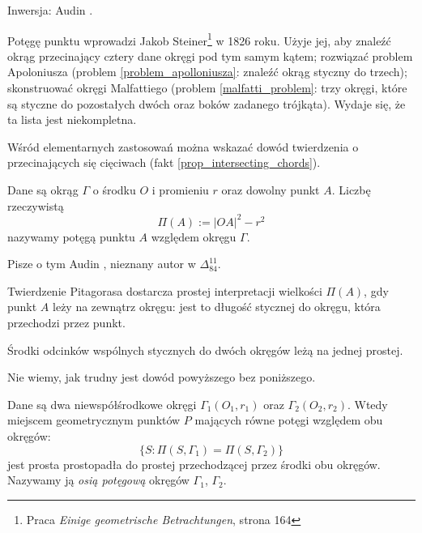 
Inwersja: Audin \cite[s. 84]{audin_2003}.


Potęgę punktu wprowadzi Jakob Steiner\footnote{Praca \emph{Einige geometrische Betrachtungen}, strona 164} w 1826 roku.
%
Użyje jej, aby znaleźć okrąg przecinający cztery dane okręgi pod tym samym kątem; rozwiązać problem Apoloniusza (problem \ref{problem_apolloniusza}: znaleźć okrąg styczny do trzech); skonstruować okręgi Malfattiego (problem \ref{malfatti_problem}: trzy okręgi, które są styczne do pozostałych dwóch oraz boków zadanego trójkąta).
%
%
Wydaje się, że ta lista jest niekompletna.

Wśród elementarnych zastosowań można wskazać dowód twierdzenia o przecinających się cięciwach (fakt \ref{prop_intersecting_chords}).

\begin{definition}
	\label{def_power_point}
	Dane są okrąg $\Gamma$ o środku $O$ i promieniu $r$ oraz dowolny punkt $A$.
	Liczbę rzeczywistą
	\begin{equation}
		\Pi(A) := |OA|^2 - r^2
	\end{equation}
	nazywamy potęgą punktu $A$ względem okręgu $\Gamma$.
\end{definition}

Pisze o tym Audin \cite[s. 89]{audin_2003}, nieznany autor w $\Delta_{84}^{11}$.

Twierdzenie Pitagorasa dostarcza prostej interpretacji wielkości $\Pi(A)$, gdy punkt $A$ leży na zewnątrz okręgu: jest to długość stycznej do okręgu, która przechodzi przez punkt.

\begin{proposition}
	Środki odcinków wspólnych stycznych do dwóch okręgów leżą na jednej prostej. %
\end{proposition}

Nie wiemy, jak trudny jest dowód powyższego bez poniższego.

\begin{proposition}
\label{guzicki_6_11}%
    Dane są dwa niewspółśrodkowe okręgi $\Gamma_1(O_1, r_1)$ oraz $\Gamma_2(O_2, r_2)$.
    Wtedy miejscem geometrycznym punktów $P$ mających równe potęgi względem obu okręgów:
	\begin{equation}
		\{S : \Pi(S, \Gamma_1) = \Pi(S, \Gamma_2)\}
	\end{equation}
	jest prosta prostopadła do prostej przechodzącej przez środki obu okręgów.
	Nazywamy ją \emph{osią potęgową} okręgów $\Gamma_1$, $\Gamma_2$.
\end{proposition}

